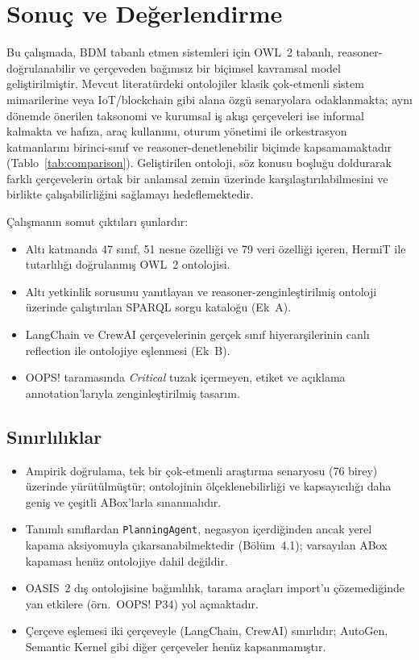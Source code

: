\documentclass[10pt, a4paper, twocolumn]{article}
\begin{document}
\section{Sonuç ve Değerlendirme}

Bu çalışmada, BDM tabanlı etmen sistemleri için OWL~2 tabanlı, reasoner-doğrulanabilir ve çerçeveden bağımsız bir biçimsel kavramsal model geliştirilmiştir. Mevcut literatürdeki ontolojiler klasik çok-etmenli sistem mimarilerine veya IoT/blockchain gibi alana özgü senaryolara odaklanmakta; aynı dönemde önerilen taksonomi ve kurumsal iş akışı çerçeveleri ise informal kalmakta ve hafıza, araç kullanımı, oturum yönetimi ile orkestrasyon katmanlarını birinci-sınıf ve reasoner-denetlenebilir biçimde kapsamamaktadır (Tablo~\ref{tab:comparison}). Geliştirilen ontoloji, söz konusu boşluğu doldurarak farklı çerçevelerin ortak bir anlamsal zemin üzerinde karşılaştırılabilmesini ve birlikte çalışabilirliğini sağlamayı hedeflemektedir.

Çalışmanın somut çıktıları şunlardır:

\begin{itemize}
    \item Altı katmanda 47 sınıf, 51 nesne özelliği ve 79 veri özelliği içeren, HermiT ile tutarlılığı doğrulanmış OWL~2 ontolojisi.
    \item Altı yetkinlik sorusunu yanıtlayan ve reasoner-zenginleştirilmiş ontoloji üzerinde çalıştırılan SPARQL sorgu kataloğu (Ek~A).
    \item LangChain ve CrewAI çerçevelerinin gerçek sınıf hiyerarşilerinin canlı reflection ile ontolojiye eşlenmesi (Ek~B).
    \item OOPS! taramasında \textit{Critical} tuzak içermeyen, etiket ve açıklama annotation'larıyla zenginleştirilmiş tasarım.
\end{itemize}

\subsection{Sınırlılıklar}

\begin{itemize}
    \item Ampirik doğrulama, tek bir çok-etmenli araştırma senaryosu (76 birey) üzerinde yürütülmüştür; ontolojinin ölçeklenebilirliği ve kapsayıcılığı daha geniş ve çeşitli ABox'larla sınanmalıdır.
    \item Tanımlı sınıflardan \texttt{PlanningAgent}, negasyon içerdiğinden ancak yerel kapama aksiyomuyla çıkarsanabilmektedir (Bölüm~4.1); varsayılan ABox kapaması henüz ontolojiye dahil değildir.
    \item OASIS~2 dış ontolojisine bağımlılık, tarama araçları import'u çözemediğinde yan etkilere (örn.\ OOPS! P34) yol açmaktadır.
    \item Çerçeve eşlemesi iki çerçeveyle (LangChain, CrewAI) sınırlıdır; AutoGen, Semantic Kernel gibi diğer çerçeveler henüz kapsanmamıştır.
\end{itemize}
\end{document}
